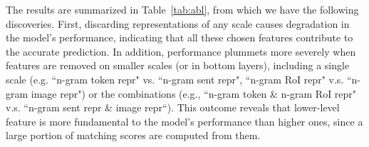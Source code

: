The results are summarized in Table~\ref{tab:abl}, from which we have the following discoveries.
First, discarding representations of any scale causes degradation in the model's performance, indicating that all these chosen features contribute to the accurate prediction.
In addition, performance plummets more severely when features are removed on smaller scales (or in bottom layers), including a single scale (e.g. ``n-gram token repr" vs. ``n-gram sent repr", ``n-gram RoI repr" v.s. ``n-gram image repr") or the combinations (e.g., ``n-gram token \& n-gram RoI repr" v.s. ``n-gram sent repr \& image repr``). 
This outcome reveals that lower-level feature is more fundamental to the model's performance than higher ones, since a large portion of matching scores are computed from them.



